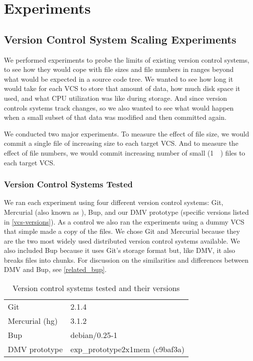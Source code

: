 \chapter{Experiments}




\section{Version Control System Scaling Experiments}

We performed experiments to probe the limits of existing version control
systems, to see how they would cope with file sizes and file numbers in ranges
beyond what would be expected in a source code tree. We wanted to see how long
it would take for each VCS to store that amount of data, how much disk space it
used, and what CPU utilization was like during storage. And since version
controls systems track changes, so we also wanted to see what would happen when
a small subset of that data was modified and then committed again.

We conducted two major experiments. To measure the effect of file size, we would
commit a single file of increasing size to each target VCS. And to measure
the effect of file numbers, we would commit increasing number of small
(\SI{1}{\kibi\byte}) files to each target VCS.



\subsection{Version Control Systems Tested}

We ran each experiment using four different version control systems: Git,
Mercurial (also known as ), Bup, and our DMV prototype (specific
versions listed in \autoref{vcs-versions}). As a control we also ran the
experiments using a dummy VCS that simple made a copy of the files. We chose Git
and Mercurial because they are the two most widely used distributed version
control systems available. We also included Bup because it uses Git's storage
format but, like DMV, it also breaks files into chunks. For discussion on the
similarities and differences between DMV and Bup, see \autoref{related_bup}.

\begin{table}
    \caption{Version control systems tested and their versions}
    \label{vcs-versions}
    \centering
    \begin{tabular}{ l l }
        \\
        Git & 2.1.4 \\
        Mercurial (hg) & 3.1.2 \\
        Bup & debian/0.25-1 \\
        DMV prototype & exp\_prototype2x1mem (c9baf3a) \\
    \end{tabular}
\end{table}


